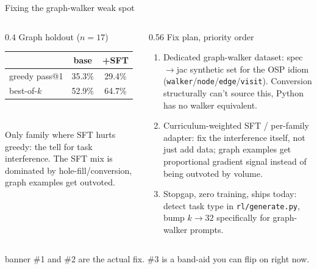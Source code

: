 \documentclass[aspectratio=169,10pt]{beamer}
\begin{document}
\begin{frame}{Fixing the graph-walker weak spot}
  \begin{columns}[T]
    \begin{column}{0.4\textwidth}
      \small\centering
      Graph holdout ($n=17$)\\[2mm]
      \begin{tabular}{@{}lcc@{}}
        \toprule
        & base & +SFT \\
        \midrule
        greedy pass@1 & 35.3\% & \alert{29.4\%} \\
        best-of-$k$ & 52.9\% & 64.7\% \\
        \bottomrule
      \end{tabular}
      \\[3mm]
      \raggedright\footnotesize
      Only family where SFT \alert{hurts} greedy: the tell for task interference. The SFT mix is dominated by hole-fill/conversion, graph examples get outvoted.
    \end{column}
    \begin{column}{0.56\textwidth}
      \small
      Fix plan, priority order
      \begin{enumerate}\itemsep0.5em
        \item Dedicated graph-walker dataset: spec$\rightarrow$jac synthetic set for the OSP idiom (\texttt{walker}/\texttt{node}/\texttt{edge}/\texttt{visit}). Conversion structurally can't source this, Python has no walker equivalent.
        \item Curriculum-weighted SFT / per-family adapter: fix the interference itself, not just add data; graph examples get proportional gradient signal instead of being outvoted by volume.
        \item Stopgap, zero training, ships today: detect task type in \texttt{rl/generate.py}, bump $k\to32$ specifically for graph-walker prompts.
      \end{enumerate}
    \end{column}
  \end{columns}
  \vspace{3mm}
  \centering
  \begin{beamercolorbox}[rounded=true,sep=1.5mm,wd=0.92\textwidth]{banner}
    \centering \#1 and \#2 are the actual fix. \#3 is a band-aid you can flip on right now.
  \end{beamercolorbox}
\end{frame}
\end{document}
